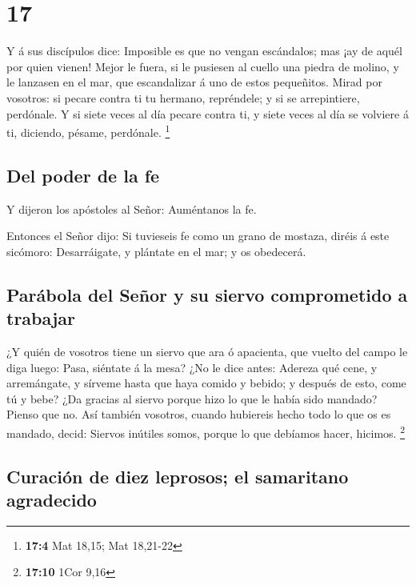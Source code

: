 \hypertarget{section-16}{%
\section{17}\label{section-16}}

 Y á sus discípulos dice: Imposible es que no vengan
escándalos; mas ¡ay de aquél por quien vienen!  Mejor le
fuera, si le pusiesen al cuello una piedra de molino, y le lanzasen en
el mar, que escandalizar á uno de estos pequeñitos.  Mirad
por vosotros: si pecare contra ti tu hermano, repréndele; y si se
arrepintiere, perdónale.  Y si siete veces al día pecare
contra ti, y siete veces al día se volviere á ti, diciendo, pésame,
perdónale. \footnote{\textbf{17:4} Mat 18,15; Mat 18,21-22}

\hypertarget{del-poder-de-la-fe}{%
\subsection{Del poder de la fe}\label{del-poder-de-la-fe}}

 Y dijeron los apóstoles al Señor: Auméntanos la fe.

 Entonces el Señor dijo: Si tuvieseis fe como un grano de
mostaza, diréis á este sicómoro: Desarráigate, y plántate en el mar; y
os obedecerá.

\hypertarget{paruxe1bola-del-seuxf1or-y-su-siervo-comprometido-a-trabajar}{%
\subsection{Parábola del Señor y su siervo comprometido a
trabajar}\label{paruxe1bola-del-seuxf1or-y-su-siervo-comprometido-a-trabajar}}

 ¿Y quién de vosotros tiene un siervo que ara ó apacienta,
que vuelto del campo le diga luego: Pasa, siéntate á la mesa?
 ¿No le dice antes: Adereza qué cene, y arremángate, y
sírveme hasta que haya comido y bebido; y después de esto, come tú y
bebe?  ¿Da gracias al siervo porque hizo lo que le había
sido mandado? Pienso que no.  Así también vosotros, cuando
hubiereis hecho todo lo que os es mandado, decid: Siervos inútiles
somos, porque lo que debíamos hacer, hicimos. \footnote{\textbf{17:10}
  1Cor 9,16}

\hypertarget{curaciuxf3n-de-diez-leprosos-el-samaritano-agradecido}{%
\subsection{Curación de diez leprosos; el samaritano
agradecido}\label{curaciuxf3n-de-diez-leprosos-el-samaritano-agradecido}}

